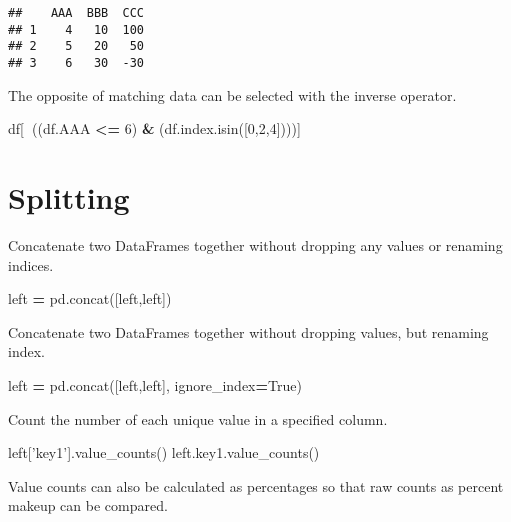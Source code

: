 \documentclass[]{book}
\newenvironment{Shaded}{\begin{snugshade}}{\end{snugshade}}
\newcommand{\DecValTok}[1]{\textcolor[rgb]{0.00,0.00,0.81}{#1}}
\newcommand{\NormalTok}[1]{#1}
\newcommand{\OperatorTok}[1]{\textcolor[rgb]{0.81,0.36,0.00}{\textbf{#1}}}
\newcommand{\StringTok}[1]{\textcolor[rgb]{0.31,0.60,0.02}{#1}}
\newcommand{\VariableTok}[1]{\textcolor[rgb]{0.00,0.00,0.00}{#1}}
\begin{document}
\begin{verbatim}
##    AAA  BBB  CCC
## 1    4   10  100
## 2    5   20   50
## 3    6   30  -30
\end{verbatim}

The opposite of matching data can be selected with the inverse operator.

\begin{Shaded}
\begin{Highlighting}[]
\NormalTok{df[}\OperatorTok{~}\NormalTok{((df.AAA }\OperatorTok{<=} \DecValTok{6}\NormalTok{) }\OperatorTok{&}\NormalTok{ (df.index.isin([}\DecValTok{0}\NormalTok{,}\DecValTok{2}\NormalTok{,}\DecValTok{4}\NormalTok{])))]}
\end{Highlighting}
\end{Shaded}

\hypertarget{splitting}{%
\section{Splitting}\label{splitting}}

Concatenate two DataFrames together without dropping any values or renaming indices.

\begin{Shaded}
\begin{Highlighting}[]
\NormalTok{left }\OperatorTok{=}\NormalTok{ pd.concat([left,left])}
\end{Highlighting}
\end{Shaded}

Concatenate two DataFrames together without dropping values, but renaming index.

\begin{Shaded}
\begin{Highlighting}[]
\NormalTok{left }\OperatorTok{=}\NormalTok{ pd.concat([left,left], ignore_index}\OperatorTok{=}\VariableTok{True}\NormalTok{)}
\end{Highlighting}
\end{Shaded}

Count the number of each unique value in a specified column.

\begin{Shaded}
\begin{Highlighting}[]
\NormalTok{left[}\StringTok{'key1'}\NormalTok{].value_counts()}
\NormalTok{left.key1.value_counts()}
\end{Highlighting}
\end{Shaded}

Value counts can also be calculated as percentages so that raw counts as percent makeup can be compared.
\end{document}
